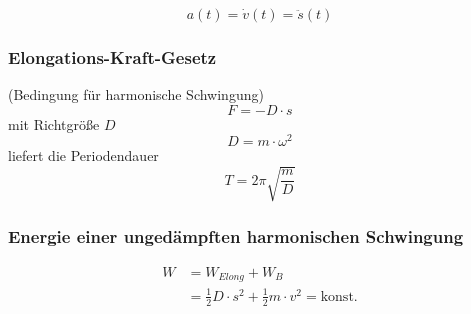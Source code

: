 \begin{equation}\label{eq:schwingung:beschleunigung:allgemein}
a(t) = \dot{v}(t) = \ddot{s}(t)
\end{equation}

\subsubsection{Elongations-Kraft-Gesetz}
(Bedingung für harmonische Schwingung)
\begin{equation}\label{eq:schwingung:ruecktreibende:kraft}
F = - D \cdot s
\end{equation}
mit Richtgröße $D$
\begin{equation}\label{eq:schwingung:richtgroesse}
D = m \cdot \omega^2
\end{equation}
liefert die Periodendauer
\begin{equation}\label{eq:schwingung:periodendauer}
T = 2\pi \sqrt{\frac{m}{D}}
\end{equation}

\subsubsection{Energie einer ungedämpften harmonischen Schwingung}
\begin{equation}\label{eq:energie:ungedaempfte;harmonische:schwingung}
\begin{split}
W &= W_{Elong} + W_B \\
   &= \frac{1}{2} D \cdot s^2 + \frac{1}{2} m \cdot v^2 = \text{konst.}
\end{split}
\end{equation}

